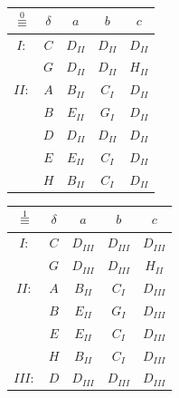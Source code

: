 \documentclass[a4paper,11pt]{article}[24.3.2010]
\begin{document}
\begin{enumerate}
\begin{enumerate}
\begin{itemize}
        \begin{table}[ht]
        \begin{center}
        \begin{tabular}{ c  c | c  c  c } 
        $\overset{0}{\equiv}$ & $\delta$ & $a$ & $b$ & $c$ \\ 
        \hline
        $I:$ & $C$ & $D_{II}$ & $D_{II}$ & $D_{II}$ \\ 
        & $G$ & $D_{II}$ & $D_{II}$ & $H_{II}$ \\
        \hline
        $II:$ & $A$ & $B_{II}$ & $C_{I}$ & $D_{II}$ \\ 
        & $B$ & $E_{II}$ & $G_{I}$ & $D_{II}$ \\
        & $D$ & $D_{II}$ & $D_{II}$ & $D_{II}$ \\
        & $E$ & $E_{II}$ & $C_{I}$ & $D_{II}$ \\
        & $H$ & $B_{II}$ & $C_{I}$ & $D_{II}$ \\
        \end{tabular}
        \quad
        \begin{tabular}{ c  c | c  c  c } 
        $\overset{1}{\equiv}$ & $\delta$ & $a$ & $b$ & $c$ \\ 
        \hline
        $I:$ & $C$ & $D_{III}$ & $D_{III}$ & $D_{III}$ \\ 
        & $G$ & $D_{III}$ & $D_{III}$ & $H_{II}$ \\
        \hline
        $II:$ & $A$ & $B_{II}$ & $C_{I}$ & $D_{III}$ \\ 
        & $B$ & $E_{II}$ & $G_{I}$ & $D_{III}$ \\
        & $E$ & $E_{II}$ & $C_{I}$ & $D_{III}$ \\
        & $H$ & $B_{II}$ & $C_{I}$ & $D_{III}$ \\
        \hline
        $III:$ & $D$ & $D_{III}$ & $D_{III}$ & $D_{III}$ \\
        \end{tabular}
        \end{center}
        \end{table}


\end{itemize}
\end{enumerate}
\end{enumerate}
\end{document}
